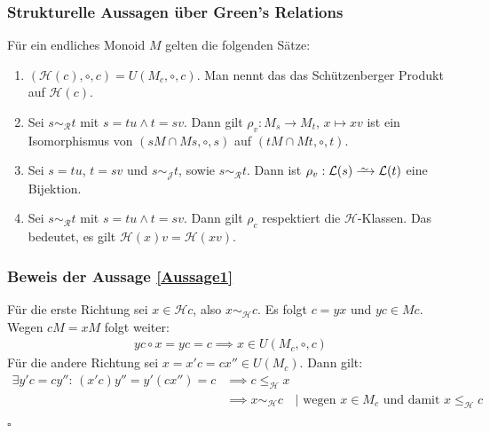 \documentclass[12pt, german]{article}
\newcommand\iso{\xrightarrow{
		\,\smash{\raisebox{-0.65ex}{\ensuremath{\scriptstyle\sim}}}\,}}
\newcommand{\grer}{\sim_{\mathcal{R}}}
\newcommand{\grej}{\sim_{\mathcal{J}}}
\newcommand{\greh}{\sim_{\mathcal{H}}}
\newcommand{\lgreheq}{\leqslant_{\mathcal{H}}}
\newcommand{\lcal}{\mathcal L}
\newcommand{\hcal}{\mathcal H}
\newcommand{\bewiesen}{
	
	\begin{flushright}
		$\square$  \\
\end{flushright}}
\begin{document}
	
	\subsubsection{Strukturelle Aussagen über Green's Relations}
	Für ein endliches Monoid $M$ gelten die  folgenden Sätze:
	\begin{enumerate}[label = \alph*)]
		\item  \label{Aussage1}$(\hcal(c), \circ, c) = U(M_c, \circ, c)$. Man nennt das das Schützenberger Produkt auf $\hcal(c)$.
		\item  \label{Aussage2} Sei $s \grer t$ mit $s = tu \land t = sv$. Dann gilt $\rho_v: M_s \to M_t, \, x \mapsto xv$ ist ein Isomorphismus von $(sM \cap Ms, \circ, s)$ auf $(tM \cap Mt, \circ, t)$.
		\item  \label{Aussage3} Sei $s = tu$, $t = sv$ und $s \grej t$, sowie $s \grer t$. Dann ist $\rho_v: \lcal(s) \iso \lcal(t)$ eine Bijektion. 
		\item  \label{Aussage4} Sei $s \grer t$ mit $s = tu \land t = sv$. Dann gilt $\rho_c$ respektiert die $\hcal$-Klassen. Das bedeutet, es gilt $\hcal(x)v = \hcal(xv)$.
	\end{enumerate}
	
	\subsubsection{Beweis der Aussage \ref{Aussage1}}
	Für die erste Richtung sei $x \in \hcal c $, also $x \greh c $. Es folgt $c = yx$ und $yc \in Mc$.
	Wegen $cM = xM$ folgt weiter:
	\begin{align*}
		 yc \circ x = yc = c 
		\implies x \in U(M_c, \circ, c)
	\end{align*}
	Für die andere Richtung sei $x = x'c = cx'' \in U(M_c)$. Dann gilt: 
	\begin{align*}
		 \exists y'c = c y'' :\, (x'c)y'' = y'(cx'') =c 
		&\implies c \lgreheq x \\
		&\implies x \greh c \quad| \text{ wegen } x \in M_c \text{ und damit } x \lgreheq c
	\end{align*}
	\bewiesen
	
\end{document}

